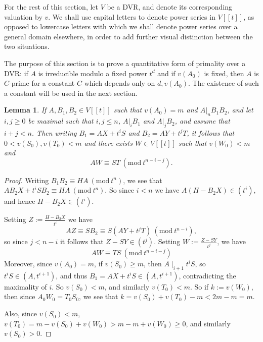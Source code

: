 \documentclass{article}
\newcommand{\Mod}[1]{\ (\mathrm{mod}\ #1)}
\theoremstyle{plain}
\newtheorem{lemma}[theorem]{Lemma}
\theoremstyle{definition}
\theoremstyle{remark}
\theoremstyle{plain}
\begin{document}

For the rest of this section, let $V$ be a DVR, and denote its corresponding valuation by $v$. We shall use capital letters to denote power series in $V[[t]]$, as opposed to lowercase letters with which we shall denote power series over a general domain elsewhere, in order to add further visual distinction between the two situations.

The purpose of this section is to prove a quantitative form of primality over a DVR: if $A$ is irreducible modulo a fixed power $t^d$ and if $v(A_0)$ is fixed, then $A$ is $C$-prime for a constant $C$ which depends only on $d, v(A_0)$. The existence of such a constant will be used in the next section.

\begin{lemma}\label{auxillary}
If $A,B_1,B_2\in V[[t]]$ such that $v(A_0)=m$ and $A|_n B_1B_2$, and let $i,j\geq 0$ be maximal such that $i,j\leq n$, $A|_i B_1$ and $A|_j B_2$, and assume that $i+j<n$. Then writing $B_1=AX+t^iS$ and $B_2=AY+t^jT$, it follows that $0<v(S_0),v(T_0)<m$ and there exists $W\in V[[t]]$ such that $v(W_0)<m$ and $$AW\equiv ST\Mod{t^{n-i-j}}.$$
\end{lemma}

\begin{proof}

Writing $B_1B_2\equiv HA\Mod{t^n}$, we see that $AB_2X+t^iSB_2\equiv HA\Mod{t^n}$. So since $i<n$ we have $A(H-B_2X)\in (t^i)$, and hence $H-B_2X\in (t^i)$.

Setting $Z:=\frac{H-B_2X}{t^i}$ we have $$AZ\equiv SB_2\equiv S(AY+t^jT)\Mod{t^{n-i}},$$ so since $j<n-i$ it follows that $Z-SY\in (t^j)$. Setting $W:=\frac{Z-SY}{t^j}$, we have $$AW\equiv TS\Mod{t^{n-i-j}}$$ Moreover, since $v(A_0)=m$, if $v(S_0)\geq m$, then $A\mid_{i+1} t^iS$, so $t^i S\in (A,t^{i+1})$, and thus $B_1=AX+t^iS\in (A,t^{i+1})$, contradicting the maximality of $i$. So $v(S_0)<m$, and similarly $v(T_0)<m$. So if $k:=v(W_0)$, then since $A_0W_0=T_0S_0$, we see that $k=v(S_0)+v(T_0)-m<2m-m=m$. 

Also, since $v(S_0)<m$, $v(T_0)=m-v(S_0)+v(W_0)>m-m+v(W_0)\geq 0$, and similarly $v(S_0)>0$.\end{proof}
\end{document}
